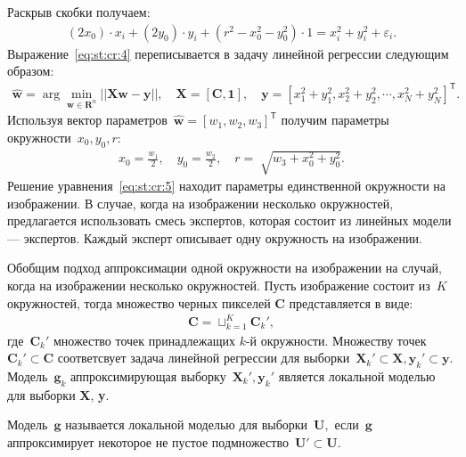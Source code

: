 Раскрыв скобки получаем:
\[
\label{eq:st:cr:4}
\begin{aligned}
\left(2x_0\right)\cdot x_i + \left(2y_0\right)\cdot y_i+\left(r^2-x_0^2-y_0^2\right)\cdot1 = x_{i}^2 + y_{i}^2 + \varepsilon_i.
\end{aligned}
\]
Выражение~\eqref{eq:st:cr:4} переписывается в задачу линейной регрессии следующим образом:
\[
\label{eq:st:cr:5}
\begin{aligned}
\hat{\textbf{w}} = \arg\min_{\textbf{w}\in \mathbf{R}^{n}}||\textbf{X}\textbf{w} - \textbf{y}||,  \quad \textbf{X} = \left[\textbf{C}, \textbf{1}\right], \quad \textbf{y} = \left[x_1^2+y_1^2, x_2^2+y_2^2, \cdots, x_N^2+y_N^2\right]^{\mathsf{T}}.
\end{aligned}
\]
Используя вектор параметров~$\hat{\textbf{w}} = \left[w_1, w_2, w_3\right]^{\mathsf{T}}$ получим параметры окружности~$x_0, y_0, r$:
\[
\label{eq:st:cr:6}
\begin{aligned}
x_0 = \frac{w_1}{2}, \quad y_0 = \frac{w_2}{2}, \quad r = \sqrt[]{w_3+x_{0}^{2}+y_{0}^{2}}.
\end{aligned}
\]
Решение уравнения~\eqref{eq:st:cr:5} находит параметры единственной окружности на изображении. В случае, когда на изображении несколько окружностей, предлагается использовать смесь экспертов, которая состоит из линейных модели --- экспертов. Каждый эксперт описывает одну окружность на изображении.

Обобщим подход аппроксимации одной окружности на изображении на случай, когда на изображении несколько окружностей. Пусть изображение состоит из~$K$ окружностей, тогда множество черных пикселей $\textbf{C}$ представляется в виде:
\[
\label{eq:st:1}
\begin{aligned}
\textbf{C} = \sqcup_{k=1}^{K}\textbf{C}_{k}',
\end{aligned}
\]
где~$\textbf{C}_{k}'$ множество точек принадлежащих $k$-й окружности. Множеству точек~$\textbf{C}_{k}' \subset\textbf{C}$ соответсвует задача линейной регрессии для выборки~$\textbf{X}_{k}' \subset \textbf{X}, \textbf{y}_{k}' \subset \textbf{y}$. Модель~$\mathbf{g}_k$ аппроксимирующая выборку~$\textbf{X}_{k}', \textbf{y}_{k}'$ является локальной моделью для выборки \textbf{X}, \textbf{y}.


\begin{definition}
\label{def:1}
Модель~$\mathbf{g}$ называется локальной моделью для выборки~$\textbf{U},$ если~$\mathbf{g}$ аппроксимирует некоторое не пустое подмножество~$\textbf{U}'\subset\textbf{U}$.
\end{definition}

